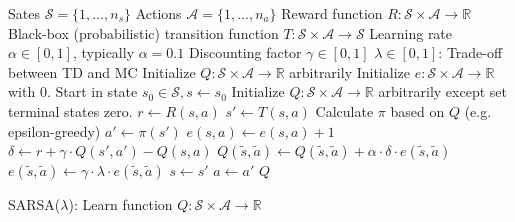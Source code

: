 \documentclass{article}
\begin{document}
	
\begin{preview}
	\begin{algorithm}[H]
		\begin{algorithmic}
			\Require
			\Statex Sates $\mathcal{S} = \{1, \dots, n_s\}$
			\Statex Actions $\mathcal{A} = \{1, \dots, n_a\}$
			\Statex Reward function $R: \mathcal{S} \times \mathcal{A} \rightarrow \mathbb{R}$
			\Statex Black-box (probabilistic) transition function $T: \mathcal{S} \times \mathcal{A} \rightarrow \mathcal{S}$
			\Statex Learning rate $\alpha \in [0, 1]$, typically $\alpha = 0.1$
			\Statex Discounting factor $\gamma \in [0, 1]$
			\Statex $\lambda \in [0, 1]$: Trade-off between TD and MC
			\State Initialize $Q: \mathcal{S} \times \mathcal{A} \rightarrow \mathbb{R}$ arbitrarily
			\State Initialize $e: \mathcal{S} \times \mathcal{A} \rightarrow \mathbb{R}$ with 0. 
			\State Start in state $s_0 \in \mathcal{S}, s \gets s_0$
			\State Initialize $Q: \mathcal{S} \times \mathcal{A} \rightarrow \mathbb{R}$ arbitrarily except set terminal states zero.
			\State $r \gets R(s, a)$
			\State $s' \gets T(s, a)$ 
			\State Calculate $\pi$ based on $Q$ (e.g. epsilon-greedy)
			\State $a' \gets \pi(s')$
			\State $e(s, a) \gets e(s, a) + 1$
			\State $\delta \gets r + \gamma \cdot Q(s', a') - Q(s, a)$
			\State $Q(\tilde{s}, \tilde{a}) \gets Q(\tilde{s}, \tilde{a}) + \alpha \cdot \delta \cdot e(\tilde{s}, \tilde{a})$
			\State $e(\tilde{s}, \tilde{a}) \gets \gamma \cdot \lambda \cdot e(\tilde{s}, \tilde{a})$
			\EndFor
			\State $s \gets s'$
			\State $a \gets a'$
			\EndWhile
			\EndWhile
			\Return $Q$
			\EndProcedure
		\end{algorithmic}
		\caption{SARSA($\lambda$): Learn function $Q: \mathcal{S} \times \mathcal{A} \rightarrow \mathbb{R}$}
		\label{alg:sarsa-lambda}
	\end{algorithm}
\end{preview}
\end{document}
